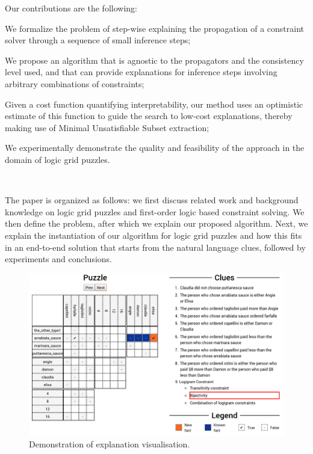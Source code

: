 \noindent Our contributions are the following:
\begin{compactitem}
	\item We formalize the problem of step-wise explaining the propagation of a constraint solver through a sequence of small inference steps;
	\item We propose an algorithm that is agnostic to the propagators and the consistency level used, and that can provide explanations for inference steps involving arbitrary combinations of constraints;
	\item Given a cost function quantifying interpretability, our method uses an optimistic estimate of this function to guide the search to low-cost explanations, thereby making use of Minimal Unsatisfiable Subset extraction;
	\item We experimentally demonstrate the quality and feasibility of the approach in the domain of logic grid puzzles.
\end{compactitem}
\ 

The paper is organized as follows: we first discuss related work and background knowledge on logic grid puzzles and first-order logic based constraint solving. We then define the problem, after which we explain our proposed algorithm. Next, we explain the instantiation of our algorithm for logic grid puzzles and how this fits in an end-to-end solution that starts from the natural language clues, followed by experiments and conclusions.


\begin{figure}[t]
\centering
\includegraphics[width=1\linewidth]{zebra_screen}
\caption{Demonstration of explanation visualisation.}
\label{fig:zebrascreen}
\end{figure}


